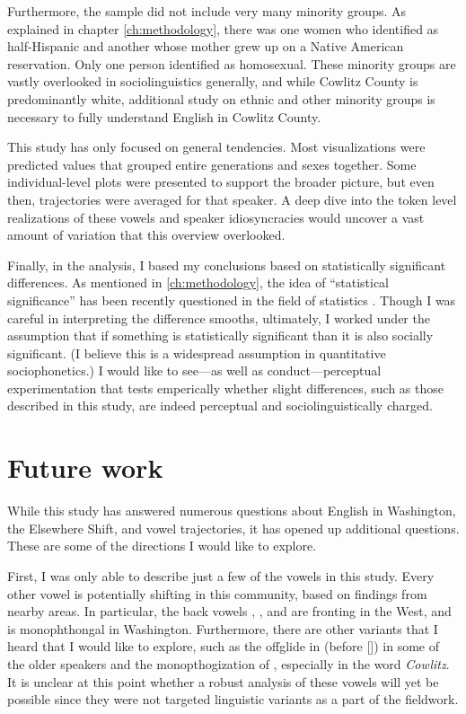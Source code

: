 Furthermore, the sample did not include very many minority groups. As explained in chapter \ref{ch:methodology}, there was one women who identified as half-Hispanic and another whose mother grew up on a Native American reservation. Only one person identified as homosexual. These minority groups are vastly overlooked in sociolinguistics generally, and while Cowlitz County is predominantly white, additional study on ethnic and other minority groups is necessary to fully understand English in Cowlitz County.

This study has only focused on general tendencies. Most visualizations were predicted values that grouped entire generations and sexes together. Some individual-level plots were presented to support the broader picture, but even then, trajectories were averaged for that speaker. A deep dive into the token level realizations of these vowels and speaker idiosyncracies would uncover a vast amount of variation that this overview overlooked.

Finally, in the analysis, I based my conclusions based on statistically significant differences. As mentioned in \ref{ch:methodology}, the idea of ``statistical significance'' has been recently questioned in the field of statistics \citep{wasserstein_etal_2019}. Though I was careful in interpreting the difference smooths, ultimately, I worked under the assumption that if something is statistically significant than it is also socially significant. (I believe this is a widespread assumption in quantitative sociophonetics.) I would like to see---as well as conduct---perceptual experimentation that tests emperically whether slight differences, such as those described in this study, are indeed perceptual and sociolinguistically charged.





\section{Future work} %

While this study has answered numerous questions about English in Washington, the Elsewhere Shift, and vowel trajectories, it has opened up additional questions. These are some of the directions I would like to explore.

First, I was only able to describe just a few of the vowels in this study. Every other vowel is potentially shifting in this community, based on findings from nearby areas. In particular, the back vowels \goose, \foot, and \goat are fronting in the West, and \face is monophthongal in Washington. Furthermore, there are other variants that I heard that I would like to explore, such as the offglide in \bash (\trap before []) in some of the older speakers and the monopthogization of \mouth, especially in the word \textit{Cowlitz}. It is unclear at this point whether a robust analysis of these vowels will yet be possible since they were not targeted linguistic variants as a part of the fieldwork.

